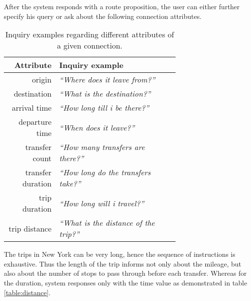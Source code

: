 After the system responds with a route proposition, the user can either further specify his query or ask about the following connection attributes.

\begin{table}[h]
\centering
\begin{tabular}{ r | p{0.7\linewidth} }
	\textbf{Attribute} & \textbf{Inquiry example} \\ \hline
	origin & \textit{``Where does it leave from?''} \\
	destination & \textit{``What is the destination?''} \\
	arrival time & \textit{``How long till i be there?''} \\
	departure time & \textit{``When does it leave?''} \\
	transfer count & \textit{``How many transfers are there?''} \\
	transfer duration & \textit{``How long do the transfers take?''} \\
	trip duration & \textit{``How long will i travel?''} \\
	trip distance & \textit{``What is the distance of the trip?''}
\end{tabular}
\caption[Details about provided connection]{Inquiry examples regarding different attributes of a given connection.}
\label{table:attributes}
\end{table}

The trips in New York can be very long, hence the sequence of instructions is exhaustive.
Thus the length of the trip informs not only about the mileage, but also about the number of stops to pass through before each transfer.
Whereas for the duration, system responses only with the time value as demonstrated in table \ref{table:distance}.

